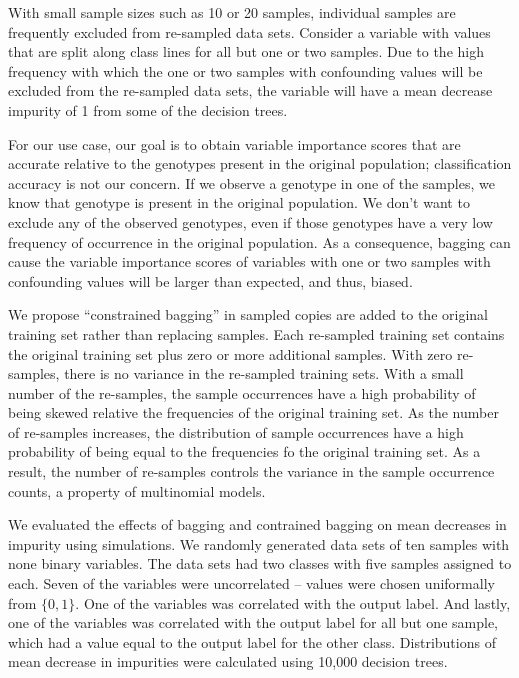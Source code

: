 With small sample sizes such as 10 or 20 samples, individual samples are frequently excluded from re-sampled data sets.  Consider a variable with values that are split along class lines for all but one or two samples. Due to the high frequency with which the one or two samples with confounding values will be excluded from the re-sampled data sets, the variable will have a mean decrease impurity of 1 from some of the decision trees. 

For our use case, our goal is to obtain variable importance scores that are accurate relative to the genotypes present in the original population; classification accuracy is not our concern.  If we observe a genotype in one of the samples, we know that genotype is present in the original population. We don't want to exclude any of the observed genotypes, even if those genotypes have a very low frequency of occurrence in the original population.  As a consequence, bagging can cause the variable importance scores of variables with one or two samples with confounding values will be larger than expected, and thus, biased.

We propose ``constrained bagging'' in sampled copies are added to the original training set rather than replacing samples.  Each re-sampled training set contains the original training set plus zero or more additional samples.   With zero re-samples, there is no variance in the re-sampled training sets.  With a small number of the re-samples, the sample occurrences have a high probability of being skewed relative the frequencies of the original training set.  As the number of re-samples increases, the distribution of sample occurrences have a high probability of being equal to the frequencies fo the original training set.  As a result, the number of re-samples controls the variance in the sample occurrence counts, a property of multinomial models.

We evaluated the effects of bagging and contrained bagging on mean decreases in impurity using simulations.  We randomly generated data sets of ten samples with none binary variables. The data sets had two classes with five samples assigned to each.  Seven of the variables were uncorrelated -- values were chosen uniformally from $\{0, 1\}$. One of the variables was correlated with the output label.  And lastly, one of the variables was correlated with the output label for all but one sample, which had a value equal to the output label for the other class.  Distributions of mean decrease in impurities were calculated using 10,000 decision trees.

